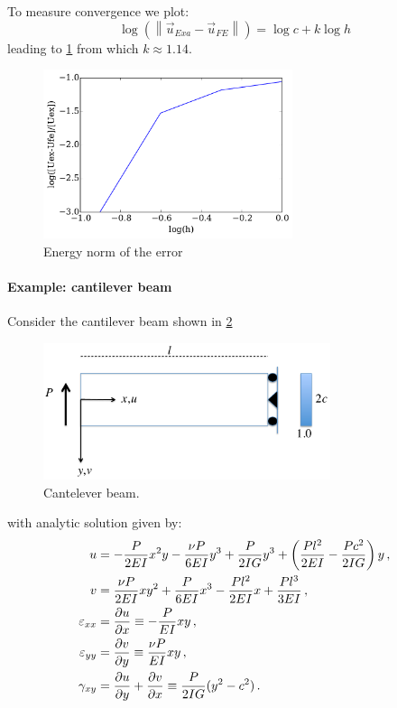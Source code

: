 To measure convergence we plot:
\[\log \left( {\left\| {{{\vec u}_{Exa}} - {{\vec u}_{FE}}} \right\|} \right) = 
\log c + k\log h\]
leading to \cref{fig:conv} from which  $k \approx 1.14.$
\begin{figure}[H]
\centering
\includegraphics[width=0.65\textwidth]{img/conver.pdf}
\caption{Energy norm of the error}
\label{fig:conv}
\end{figure}

\newpage


\paragraph*{Example: cantilever beam}
Consider the cantilever beam shown in \cref{fig:viga}

\begin{figure}[H]
\centering
\includegraphics[width=0.75\textwidth]{img/beam.pdf}
\caption{Cantelever beam.}
\label{fig:viga}
\end{figure}
with analytic solution \citep{book:timoshenko} given by:
\begin{align*}
u &=  -\frac{P}{2EI} x^2 y - \frac{\nu P}{6EI} y^3 + \frac{P}{2IG}{y^3} + 
\left(\frac{P l^2}{2EI} - \frac{P c^2}{2IG}\right)y \, ,\\
v &= \frac{\nu P}{2EI} x y^2 + \frac{P}{6EI} x^3 - 
\frac{Pl^2}{2EI}x + \frac{Pl^3}{3EI}\, ,\\
\varepsilon_{xx} &= \pdv{u}{x} \equiv - \frac{P}{EI}xy\, ,\\
\varepsilon_{yy} &= \pdv{v}{y} \equiv \frac{\nu P}{EI} xy\, ,\\
\gamma_{xy} &= \pdv{u}{y} + \pdv{v}{x} \equiv \frac{P}{2IG} (y^2 - c^2)\, .
\end{align*}

